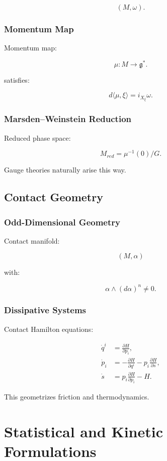 \documentclass[11pt]{book}
\begin{document}
\[
(M,\omega).
\]

\section{Momentum Map}

Momentum map:

\[
\mu:M\to\mathfrak g^*.
\]

satisfies:

\[
d\langle\mu,\xi\rangle
=
i_{X_\xi}\omega.
\]

\section{Marsden--Weinstein Reduction}

Reduced phase space:

\[
M_{red}
=
\mu^{-1}(0)/G.
\]

Gauge theories naturally arise this way.

\chapter{Contact Geometry}

\section{Odd-Dimensional Geometry}

Contact manifold:

\[
(M,\alpha)
\]

with:

\[
\alpha\wedge(d\alpha)^n\neq0.
\]

\section{Dissipative Systems}

Contact Hamilton equations:

\begin{align}
\dot q^i &= \frac{\partial H}{\partial p_i},\\
\dot p_i &= -\frac{\partial H}{\partial q^i}-p_i\frac{\partial H}{\partial s},\\
\dot s &= p_i\frac{\partial H}{\partial p_i}-H.
\end{align}

This geometrizes friction and thermodynamics.

\part{Statistical and Kinetic Formulations}
\end{document}
